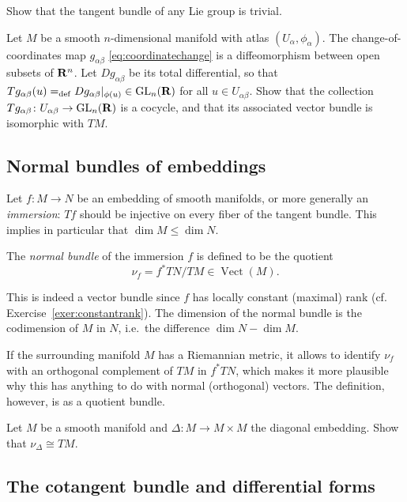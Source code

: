 \documentclass[a4paper,openany]{scrbook}
\DeclareMathOperator{\Vect}{Vect}
\begin{document}
\begin{exer}
Show that the tangent bundle of any Lie group is trivial.
\end{exer}

\begin{exer}
Let $M$ be a smooth $n$-dimensional manifold with atlas $(U_\alpha,\phi_\alpha)$. The change-of-coordinates map $g_{\alpha\beta}$ \eqref{eq:coordinatechange} is a diffeomorphism between open subsets of $\mathbf R^n$. Let $Dg_{\alpha\beta}$ be its total differential, so that $Tg_{\alpha\beta}(u) =_{\operatorname{def}} Dg_{\alpha\beta}|_{\phi(u)} \in \operatorname{GL}_n(\mathbf R)$ for all $u \in U_{\alpha\beta}$. Show that the collection $Tg_{\alpha\beta}\colon U_{\alpha\beta} \to \operatorname{GL}_n(\mathbf R)$ is a cocycle, and that its associated vector bundle is isomorphic with $TM$.
\end{exer}

\subsection{Normal bundles of embeddings}

Let $f\colon M \to N$ be an embedding of smooth manifolds, or more generally an \emph{immersion}: $Tf$ should be injective on every fiber of the tangent bundle. This implies in particular that $\dim M \leq \dim N$.

\begin{defn}
The \emph{normal bundle} of the immersion $f$ is defined to be the quotient
\[
\nu_{f} = f^*TN/TM \in \Vect(M).
\]
\end{defn}

This is indeed a vector bundle since $f$ has locally constant (maximal) rank (cf. Exercise~\ref{exer:constantrank}). The dimension of the normal bundle is the codimension of $M$ in $N$, i.e.\ the difference $\dim N-\dim M$. 

If the surrounding manifold $M$ has a Riemannian metric, it allows to identify $\nu_f$ with an orthogonal complement of $TM$ in $f^*TN$, which makes it more plausible why this has anything to do with normal (orthogonal) vectors. The definition, however, is as a quotient bundle.

\begin{exer}\label{exer:normalofdiagonal}
Let $M$ be a smooth manifold and $\Delta\colon M \to M \times M$ the diagonal embedding. Show that $\nu_{\Delta} \cong TM$.
\end{exer}

\subsection{The cotangent bundle and differential forms}
\end{document}
